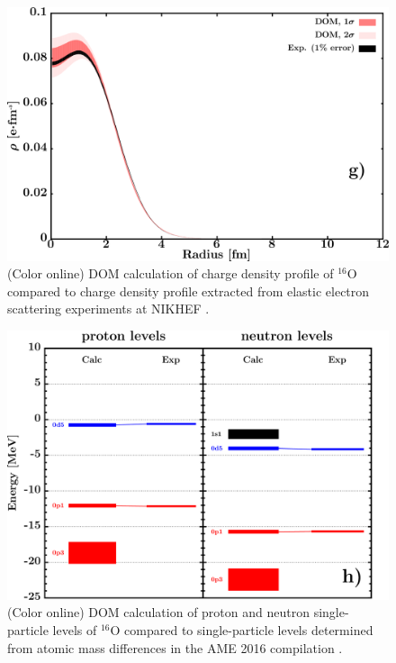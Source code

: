 \documentclass[twocolumn,secnumarabic,amssymb, nobibnotes, aps, prl,
superscriptaddress, nobalancelastpage]{revtex4}
\begin{document}
\begin{figure}
    \includegraphics[scale=0.35]{figures/o16_chargeDensity.png}
    \caption{(Color online) DOM calculation of charge density profile of $^{16}$O compared to
        charge density profile extracted from elastic electron scattering
        experiments at NIKHEF \cite{DeVries}.
    }
    \label{O16_QDens_DOMFit}
\end{figure}

\begin{figure}
    \includegraphics[scale=0.35]{figures/o16_SPLevels.png}
    \caption{(Color online) DOM calculation of proton and neutron single-particle
        levels of $^{16}$O compared to
        single-particle levels determined from atomic mass differences in the
        AME 2016 compilation \cite{AME2016}.
    }
    \label{O16_SPLevels_DOMFit}
\end{figure}
\end{document}
